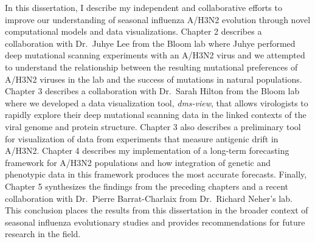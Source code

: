 In this dissertation, I describe my independent and collaborative efforts to improve our understanding of seasonal influenza A/H3N2 evolution through novel computational models and data visualizations.
Chapter 2 describes a collaboration with Dr.\ Juhye Lee from the Bloom lab where Juhye performed deep mutational scanning experiments with an A/H3N2 virus and we attempted to understand the relationship between the resulting mutational preferences of A/H3N2 viruses in the lab and the success of mutations in natural populations.
Chapter 3 describes a collaboration with Dr.\ Sarah Hilton from the Bloom lab where we developed a data visualization tool, \emph{dms-view}, that allows virologists to rapidly explore their deep mutational scanning data in the linked contexts of the viral genome and protein structure.
Chapter 3 also describes a preliminary tool for visualization of data from experiments that measure antigenic drift in A/H3N2.
Chapter 4 describes my implementation of a long-term forecasting framework for A/H3N2 populations and how integration of genetic and phenotypic data in this framework produces the most accurate forecasts.
Finally, Chapter 5 synthesizes the findings from the preceding chapters and a recent collaboration with Dr.\ Pierre Barrat-Charlaix from Dr.\ Richard Neher's lab.
This conclusion places the results from this dissertation in the broader context of seasonal influenza evolutionary studies and provides recommendations for future research in the field.

